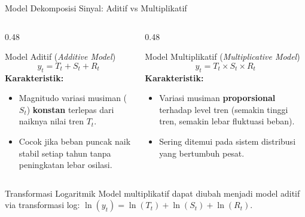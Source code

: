 \documentclass[aspectratio=169, 10pt]{beamer}
\begin{document}
\begin{frame}{Model Dekomposisi Sinyal: Aditif vs Multiplikatif}
    \begin{columns}[T]
        \begin{column}{0.48\textwidth}
            \begin{block}{Model Aditif (\textit{Additive Model})}
                \begin{equation}
                    y_t = T_t + S_t + R_t
                \end{equation}
                \textbf{Karakteristik:}
                \begin{itemize}
                    \item Magnitudo variasi musiman ($S_t$) \textbf{konstan} terlepas dari naiknya nilai tren $T_t$.
                    \item Cocok jika beban puncak naik stabil setiap tahun tanpa peningkatan lebar osilasi.
                \end{itemize}
            \end{block}
        \end{column}
        \begin{column}{0.48\textwidth}
            \begin{block}{Model Multiplikatif (\textit{Multiplicative Model})}
                \begin{equation}
                    y_t = T_t \times S_t \times R_t
                \end{equation}
                \textbf{Karakteristik:}
                \begin{itemize}
                    \item Variasi musiman \textbf{proporsional} terhadap level tren (semakin tinggi tren, semakin lebar fluktuasi beban).
                    \item Sering ditemui pada sistem distribusi yang bertumbuh pesat.
                \end{itemize}
            \end{block}
        \end{column}
    \end{columns}
    \vspace{0.2cm}
    \begin{alertblock}{Transformasi Logaritmik}
        Model multiplikatif dapat diubah menjadi model aditif via transformasi log:
        $\ln(y_t) = \ln(T_t) + \ln(S_t) + \ln(R_t)$.
    \end{alertblock}
\end{frame}
\end{document}
